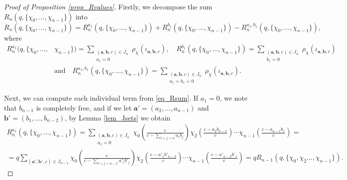     \begin{proof}[Proof of Proposition \ref{prop_Rvalues}]
        Firstly, we decompose the sum $R_n(q,\{\chi_0,\ldots,\chi_{n-1}\})$ into
        \begin{equation}\label{eq_Rsum}
            R_n(q,\{\chi_0,\ldots,\chi_{n-1}\})=R_n^{a_1}(q,\{\chi_0,\ldots,\chi_{n-1}\})+R_n^{b_1}(q,\{\chi_0,\ldots,\chi_{n-1}\})-R_n^{a_1,b_1}(q,\{\chi_0,\ldots,\chi_{n-1}\}),
        \end{equation}
        where
        \begin{align*}
            R_n^{a_1}(q,\{\chi_0,\ldots,&\chi_{n-1}\})=\sum_{\substack{(\mathbf{a},\mathbf{b},c)\in J_n\\ a_1=0}}\rho_\chi(\iota_{\mathbf{a},\mathbf{b},c}), \quad R_n^{b_1}(q,\{\chi_0,\ldots,\chi_{n-1}\})=\sum_{\substack{(\mathbf{a},\mathbf{b},c)\in J_n\\ b_1=0}}\rho_\chi(\iota_{\mathbf{a},\mathbf{b},c})\\
            &\text{and}\quad R_n^{a_1,b_1}(q,\{\chi_0,\ldots,\chi_{n-1}\})=\sum_{\substack{(\mathbf{a},\mathbf{b},c)\in J_n\\ a_1=b_1=0}}\rho_\chi(\iota_{\mathbf{a},\mathbf{b},c}).
        \end{align*}

        Next, we can compute each individual term from \eqref{eq_Rsum}. If $a_1=0$, we note that $b_{n-1}$ is completely free, and if we let $\mathbf{a}'=(a_2,\ldots,a_{n-1})$ and $\mathbf{b}'=(b_1,\ldots,b_{n-2})$, by Lemma \ref{lem_Jsets} we obtain
        \begin{align*}
            R_n^{a_1}(q,\{\chi_0,\ldots,\chi_{n-1}\})=\sum_{\substack{(\mathbf{a},\mathbf{b},c)\in J_n\\ a_1=0}}\chi_0\left(\frac{c}{c-\sum_{i+j=n}a_ib_j}\right)\chi_2\left(\frac{c-a_2b_{n-2}}{c}\right)%
            \cdots\chi_{n-1}\left(\frac{c-a_{n-1}b_1}{c}\right)=\\
            =q\sum_{(\mathbf{a}',\mathbf{b}',c)\in J_{n-1}}\chi_0\left(\frac{c}{c-\sum_{i+j=n-1}a'_ib'_j}\right)\chi_2\left(\frac{c-a'_1b'_{n-2}}{c}\right)%
            \cdots\chi_{n-1}\left(\frac{c-a'_{n-2}b'_1}{c}\right)=qR_{n-1}(q,\{\chi_0,\chi_2\ldots,\chi_{n-1}\}).
        \end{align*}


\end{proof}

